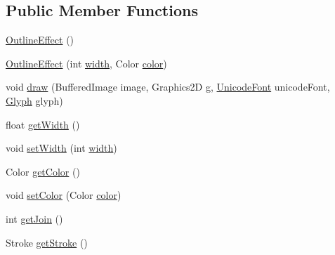 \subsection*{Public Member Functions}
\begin{DoxyCompactItemize}
\item 
\mbox{\hyperlink{classorg_1_1newdawn_1_1slick_1_1font_1_1effects_1_1_outline_effect_a3612aa4f7cd7262451da03c87191b5a3}{Outline\+Effect}} ()
\item 
\mbox{\hyperlink{classorg_1_1newdawn_1_1slick_1_1font_1_1effects_1_1_outline_effect_a07a8b95523fa231c557732fb29d92787}{Outline\+Effect}} (int \mbox{\hyperlink{classorg_1_1newdawn_1_1slick_1_1font_1_1effects_1_1_outline_effect_aad96e33c4fb5804e7423df04e1cc1936}{width}}, Color \mbox{\hyperlink{classorg_1_1newdawn_1_1slick_1_1font_1_1effects_1_1_outline_effect_a00160c4c005cb659d45c135a2798005f}{color}})
\item 
void \mbox{\hyperlink{classorg_1_1newdawn_1_1slick_1_1font_1_1effects_1_1_outline_effect_ae8ec8a0b355f211c3d97a328016f5772}{draw}} (Buffered\+Image image, Graphics2D g, \mbox{\hyperlink{classorg_1_1newdawn_1_1slick_1_1_unicode_font}{Unicode\+Font}} unicode\+Font, \mbox{\hyperlink{classorg_1_1newdawn_1_1slick_1_1font_1_1_glyph}{Glyph}} glyph)
\item 
float \mbox{\hyperlink{classorg_1_1newdawn_1_1slick_1_1font_1_1effects_1_1_outline_effect_a4e38d6349e329f70056eaed9dece69a3}{get\+Width}} ()
\item 
void \mbox{\hyperlink{classorg_1_1newdawn_1_1slick_1_1font_1_1effects_1_1_outline_effect_a1168574f5e6988eab798b7955756a923}{set\+Width}} (int \mbox{\hyperlink{classorg_1_1newdawn_1_1slick_1_1font_1_1effects_1_1_outline_effect_aad96e33c4fb5804e7423df04e1cc1936}{width}})
\item 
Color \mbox{\hyperlink{classorg_1_1newdawn_1_1slick_1_1font_1_1effects_1_1_outline_effect_ac32467f7a5e788e89065d2bdc90b22eb}{get\+Color}} ()
\item 
void \mbox{\hyperlink{classorg_1_1newdawn_1_1slick_1_1font_1_1effects_1_1_outline_effect_ac8ecec969733b28ed4ceca221fea8193}{set\+Color}} (Color \mbox{\hyperlink{classorg_1_1newdawn_1_1slick_1_1font_1_1effects_1_1_outline_effect_a00160c4c005cb659d45c135a2798005f}{color}})
\item 
int \mbox{\hyperlink{classorg_1_1newdawn_1_1slick_1_1font_1_1effects_1_1_outline_effect_a495949cd03000b18b0d3907596afeb53}{get\+Join}} ()
\item 
Stroke \mbox{\hyperlink{classorg_1_1newdawn_1_1slick_1_1font_1_1effects_1_1_outline_effect_a07b01aefe35fa2cefeb844fdb68745e9}{get\+Stroke}} ()

\end{DoxyCompactItemize}
